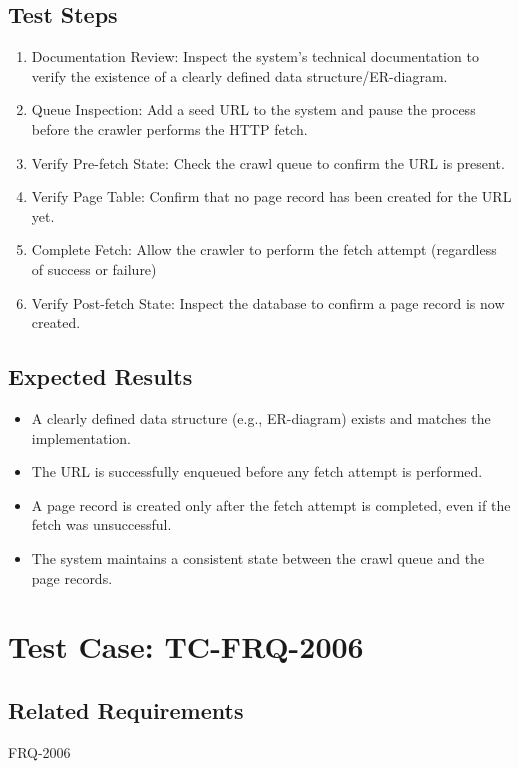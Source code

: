 \documentclass{article}
\begin{document}
\subsection*{Test Steps}
\begin{enumerate}
  \item Documentation Review: Inspect the system's technical 
  documentation to verify the existence of a clearly defined data structure/ER-diagram.
  \item Queue Inspection: Add a seed URL to the system and pause
   the process before the crawler performs the HTTP fetch.
  \item Verify Pre-fetch State: Check the crawl queue to confirm the URL is present.
  \item Verify Page Table: Confirm that no page record has been created for the URL yet.
  \item Complete Fetch: Allow the crawler to perform the fetch attempt (regardless of success or failure)
  \item Verify Post-fetch State: Inspect the database to confirm a page record is now created.
\end{enumerate}

\subsection*{Expected Results}
\begin{itemize}
  \item A clearly defined data structure (e.g., ER-diagram) exists and matches the implementation.
  \item The URL is successfully enqueued before any fetch attempt is performed.
  \item A page record is created only after the fetch attempt is completed, even if the fetch was unsuccessful.
  \item The system maintains a consistent state between the crawl queue and the page records.
\end{itemize}



\section{Test Case: TC-FRQ-2006}

\subsection*{Related Requirements}
FRQ-2006
\end{document}
